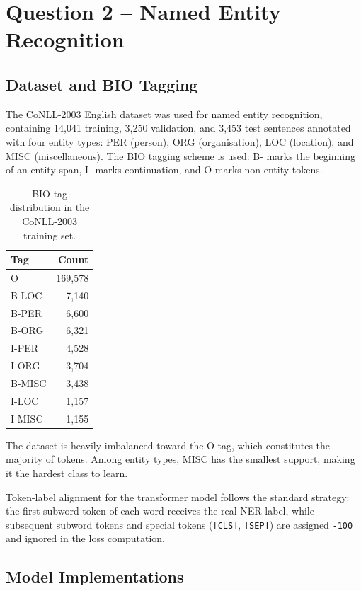 \documentclass[11pt,a4paper]{article}
\begin{document}
\section{Question 2 -- Named Entity Recognition}

\subsection{Dataset and BIO Tagging}

The CoNLL-2003 English dataset was used for named entity recognition, containing 14{,}041 training, 3{,}250 validation, and 3{,}453 test sentences annotated with four entity types: PER (person), ORG (organisation), LOC (location), and MISC (miscellaneous). The BIO tagging scheme is used: B- marks the beginning of an entity span, I- marks continuation, and O marks non-entity tokens.

\begin{table}[H]
\centering
\caption{BIO tag distribution in the CoNLL-2003 training set.}
\label{tab:q2tags}
\begin{tabular}{lr}
\toprule
Tag & Count \\
\midrule
O      & 169{,}578 \\
B-LOC  &   7{,}140 \\
B-PER  &   6{,}600 \\
B-ORG  &   6{,}321 \\
I-PER  &   4{,}528 \\
I-ORG  &   3{,}704 \\
B-MISC &   3{,}438 \\
I-LOC  &   1{,}157 \\
I-MISC &   1{,}155 \\
\bottomrule
\end{tabular}
\end{table}

The dataset is heavily imbalanced toward the O tag, which constitutes the majority of tokens. Among entity types, MISC has the smallest support, making it the hardest class to learn.

Token-label alignment for the transformer model follows the standard strategy: the first subword token of each word receives the real NER label, while subsequent subword tokens and special tokens (\texttt{[CLS]}, \texttt{[SEP]}) are assigned \texttt{-100} and ignored in the loss computation.

\subsection{Model Implementations}
\end{document}
